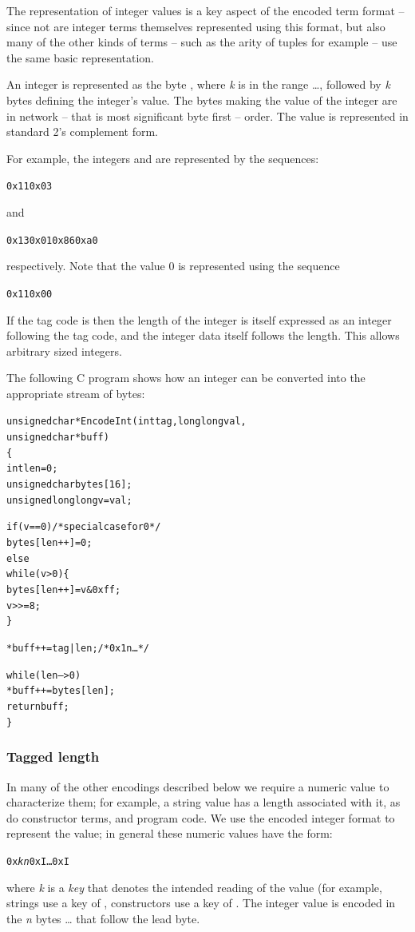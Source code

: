 The representation of integer values is a key aspect of the encoded term format -- since not are integer terms themselves represented using this format, but also many of the other kinds of terms -- such as the arity of tuples for example -- use the same basic representation.


An integer is represented as the byte  , where \emph{k} is in the range \ldots{}, followed by \emph{k} bytes defining the integer's value. The bytes making the value of the integer are in network -- that is most significant byte first -- order. The value is represented in standard 2's complement form.

For example, the integers  and  are represented by
the sequences:
\begin{alltt}
0x11 0x03
\end{alltt}
and
\begin{alltt}
0x13 0x01 0x86 0xa0
\end{alltt}
respectively.  Note that the value 0 is represented using the sequence \begin{alltt}
0x11 0x00
\end{alltt}

If the tag code is  then the length of the integer is itself expressed as an integer following the tag code, and the integer data itself follows the length. This allows arbitrary sized integers.

The following C program shows how an integer can be converted into the appropriate stream of bytes:

\begin{alltt}
unsigned char *EncodeInt(int tag,long long val,
                         unsigned char *buff)
\{
  int len=0;
  unsigned char bytes[16];
  unsigned long long v = val;

  if(v==0)              /* special case for 0 */
    bytes[len++]=0;
  else
    while(v>0)\{
      bytes[len++]=v&0xff;
      v >>= 8;
    \}

 *buff++=tag|len;       /* 0x1n \ldots{} */

  while(len-->0)
    *buff++=bytes[len];
  return buff;
\}
\end{alltt}

\subsubsection{Tagged length}
\label{encoded:tagged:length}

In many of the other encodings described below we require a numeric value to characterize them; for example, a string value has a length associated with it, as do constructor terms, and program code. We use the encoded integer format to represent the value; in general these numeric values have the form:
\begin{alltt}
0x\emph{k}\emph{n} 0xI \ldots 0xI\subn
\end{alltt}
where \emph{k} is a \emph{key} that denotes the intended reading of the value (for example, strings use a key of , constructors use a key of . The integer value is encoded in the \emph{n} bytes \ldots{} that follow the lead byte.

